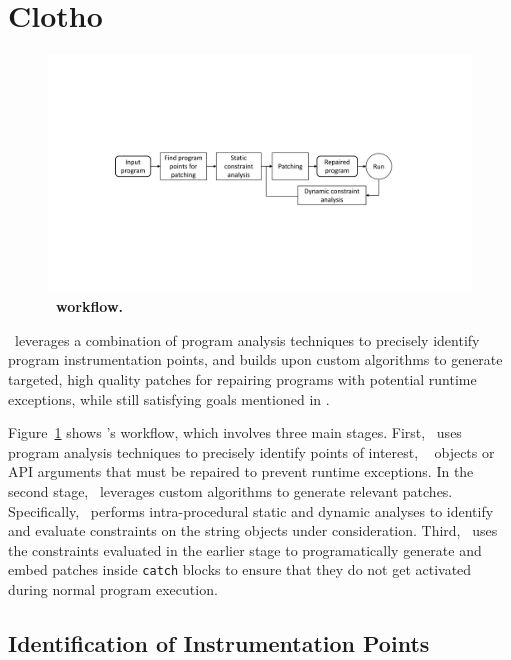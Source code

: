 \vspace{-0.1cm}
\section{Clotho}
\label{sec:design}

\begin{figure}[t]
\centering
\includegraphics[scale=.38]{images/NewDesignDiagram.pdf}
\caption{\bf \tool\ workflow.}
\label{fig:overallDesign}
\end{figure}

 \tool\ leverages a combination of program 
analysis techniques to precisely identify program instrumentation points, and
builds upon custom algorithms to generate targeted, high quality patches for
repairing programs with potential runtime exceptions, while still satisfying
goals mentioned in .

Figure~\ref{fig:overallDesign} shows \tool's workflow, which involves three
main stages. First, \tool\ uses program analysis techniques to precisely
identify points of interest, \ie\  objects or API arguments that
must be repaired to prevent runtime exceptions. In the second stage, \tool\ leverages
custom algorithms to generate relevant patches. Specifically, \tool\ performs
intra-procedural static and dynamic analyses to identify and evaluate
constraints on the string objects under consideration. Third, \tool\ uses the
constraints evaluated in the earlier stage to programatically generate and embed
patches inside \texttt{catch} blocks to ensure that they do not get activated
during normal program execution.

\subsection{Identification of Instrumentation Points}
\label{sec:tool:stage1}


